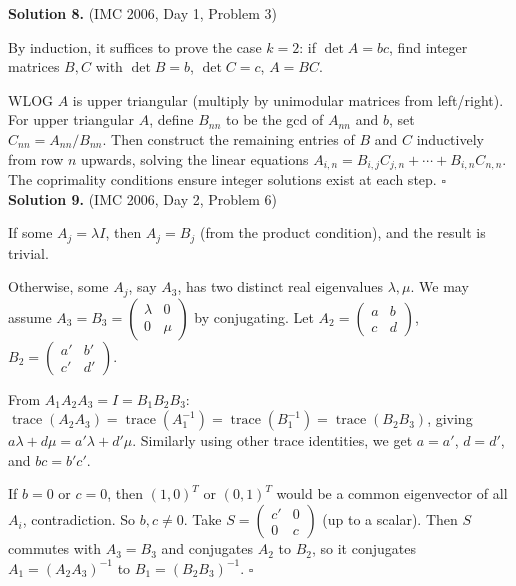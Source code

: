 \documentclass{article}
\newcommand{\tr}{\operatorname{trace}}
\begin{document}
\textbf{Solution 8.} (IMC 2006, Day 1, Problem 3)

By induction, it suffices to prove the case \( k = 2 \): if \( \det A = bc \), find integer matrices \( B, C \) with \( \det B = b \), \( \det C = c \), \( A = BC \).

WLOG \( A \) is upper triangular (multiply by unimodular matrices from left/right). For upper triangular \( A \), define \( B_{nn} \) to be the gcd of \( A_{nn} \) and \( b \), set \( C_{nn} = A_{nn}/B_{nn} \). Then construct the remaining entries of \( B \) and \( C \) inductively from row \( n \) upwards, solving the linear equations \( A_{i,n} = B_{i,j}C_{j,n} + \cdots + B_{i,n}C_{n,n} \). The coprimality conditions ensure integer solutions exist at each step. \hfill\(\square\)
\\

\textbf{Solution 9.} (IMC 2006, Day 2, Problem 6)

If some \( A_j = \lambda I \), then \( A_j = B_j \) (from the product condition), and the result is trivial.

Otherwise, some \( A_j \), say \( A_3 \), has two distinct real eigenvalues \( \lambda, \mu \). We may assume \( A_3 = B_3 = \begin{pmatrix} \lambda & 0 \\ 0 & \mu \end{pmatrix} \) by conjugating. Let \( A_2 = \begin{pmatrix} a & b \\ c & d \end{pmatrix} \), \( B_2 = \begin{pmatrix} a' & b' \\ c' & d' \end{pmatrix} \).

From \( A_1A_2A_3 = I = B_1B_2B_3 \): \( \tr(A_2A_3) = \tr(A_1^{-1}) = \tr(B_1^{-1}) = \tr(B_2B_3) \), giving \( a\lambda + d\mu = a'\lambda + d'\mu \). Similarly using other trace identities, we get \( a = a' \), \( d = d' \), and \( bc = b'c' \).

If \( b = 0 \) or \( c = 0 \), then \( (1,0)^T \) or \( (0,1)^T \) would be a common eigenvector of all \( A_i \), contradiction. So \( b, c \neq 0 \). Take \( S = \begin{pmatrix} c' & 0 \\ 0 & c \end{pmatrix} \) (up to a scalar). Then \( S \) commutes with \( A_3 = B_3 \) and conjugates \( A_2 \) to \( B_2 \), so it conjugates \( A_1 = (A_2A_3)^{-1} \) to \( B_1 = (B_2B_3)^{-1} \). \hfill\(\square\)
\\
\end{document}
